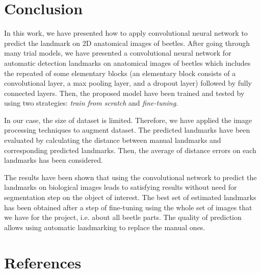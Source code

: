 \documentclass[review]{elsarticle}
\begin{document}
\section{Conclusion}
\label{sconclusion}
In this work, we have presented how to apply convolutional neural network to predict the landmark on 2D anatomical images of beetles. After going through many trial models, we have presented a convolutional neural network for automatic detection landmarks on anatomical images of beetles which includes the repeated of some elementary blocks (an elementary block consists of a convolutional layer, a max pooling layer, and a dropout layer) followed by fully connected layers. Then, the proposed model have been trained and tested by using two strategies: \textit{train from scratch} and \textit{fine-tuning}. 

In our case, the size of dataset is limited. Therefore, we have applied the image processing techniques to augment dataset. The predicted landmarks have been evaluated by calculating the distance between manual landmarks and corresponding predicted landmarks. Then, the average of distance errors on each landmarks has been considered.

The results have been shown that using the convolutional network to predict the landmarks on biological images leads to satisfying results without need for segmentation step on the object of interest. The
best set of estimated landmarks has been obtained after a step
of fine-tuning using the whole set of images that we have for the
project, i.e. about all beetle parts. The quality of prediction allows using automatic landmarking to replace the manual ones.
\section*{References}


\end{document}
